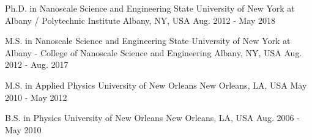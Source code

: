 
\begin{cventries}

  \cventryedu
  {Ph.D. in Nanoscale Science and Engineering} %
  {State University of New York at Albany / Polytechnic Institute} %
  {Albany, NY, USA} %
  {Aug. 2012 - May 2018} %
  {
    \begin{cvitems} %
    \end{cvitems}
  }

  \cventryedu
  {M.S. in Nanoscale Science and Engineering} %
  {State University of New York at Albany - College of Nanoscale Science and Engineering} %
  {Albany, NY, USA} %
  {Aug. 2012 - Aug. 2017} %
  {
    \begin{cvitems} %
    \end{cvitems}
  }

  \cventryedu
  {M.S. in Applied Physics} %
  {University of New Orleans} %
  {New Orleans, LA, USA} %
  {May 2010 - May 2012} %
  {
    \begin{cvitems} %
    \end{cvitems}
  }

  \cventryedu
  {B.S. in Physics} %
  {University of New Orleans} %
  {New Orleans, LA, USA} %
  {Aug. 2006 - May 2010} %
  {
    \begin{cvitems} %
    \end{cvitems}
  }

\end{cventries}
